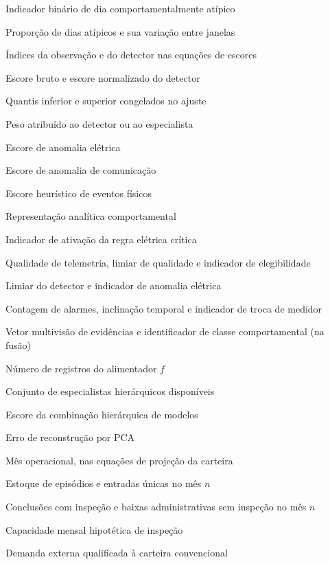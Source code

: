\begin{description}[labelsep=4mm,labelwidth=42mm,leftmargin=46mm,align=left]
  \item[$A_{u,d}$] Indicador binário de dia comportamentalmente atípico
  \item[$R_A$, $\Delta R_A$] Proporção de dias atípicos e sua variação entre janelas
  \item[$i$, $m$] Índices da observação e do detector nas equações de escores
  \item[$s_{i,m}$, $z_{i,m}$] Escore bruto e escore normalizado do detector
  \item[$a_m$, $b_m$] Quantis inferior e superior congelados no ajuste
  \item[$w_m$] Peso atribuído ao detector ou ao especialista
  \item[$S_{elec}$] Escore de anomalia elétrica
  \item[$S_{comm}$] Escore de anomalia de comunicação
  \item[$S_{tamper}$] Escore heurístico de eventos físicos
  \item[$S_{behavior}$] Representação analítica comportamental
  \item[$R_i$] Indicador de ativação da regra elétrica crítica
  \item[$q_i$, $g$, $G_i$] Qualidade de telemetria, limiar de qualidade e indicador de elegibilidade
  \item[$\tau$, $D_i$] Limiar do detector e indicador de anomalia elétrica
  \item[$a_i$, $b_i$, $m_i$] Contagem de alarmes, inclinação temporal e indicador de troca de medidor
  \item[$\mathbf e_i$, $\kappa_i$] Vetor multivisão de evidências e identificador de classe comportamental (na fusão)
  \item[$n_f$] Número de registros do alimentador $f$
  \item[$\mathcal A_i$] Conjunto de especialistas hierárquicos disponíveis
  \item[$S_i^{MoE}$] Escore da combinação hierárquica de modelos
  \item[$\varepsilon_i$] Erro de reconstrução por PCA
  \item[$n$] Mês operacional, nas equações de projeção da carteira
  \item[$B_n$, $A_n$] Estoque de episódios e entradas únicas no mês $n$
  \item[$R_n$, $X_n$] Conclusões com inspeção e baixas administrativas sem inspeção no mês $n$
  \item[$K_n$] Capacidade mensal hipotética de inspeção
  \item[$D_{\mathrm{novo},n}$] Demanda externa qualificada à carteira convencional

\end{description}
